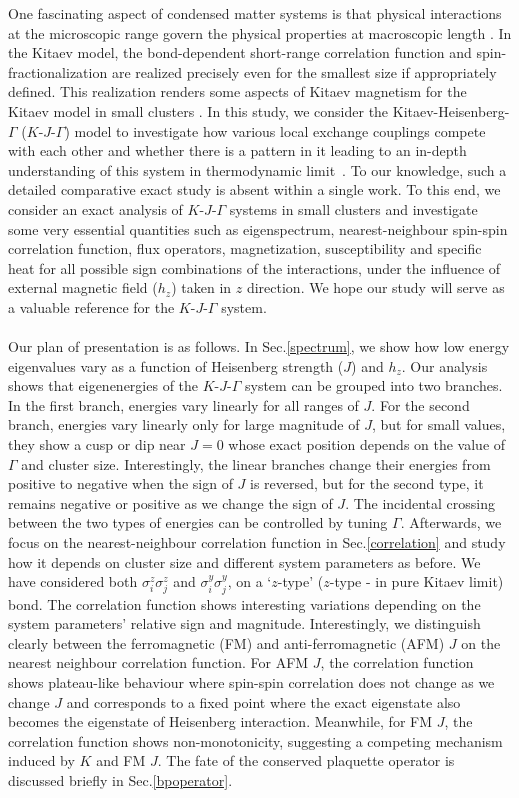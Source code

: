 \documentclass[aps,amsmath,twocolumn,amssymb,floatfix,showpacs,superscriptaddress,nofootinbib,longbibliography]{revtex4-1}
\begin{document}
One fascinating aspect of condensed matter systems is that physical interactions at the microscopic range govern the physical properties at macroscopic length \cite{anderson,fifty-years,savary-review}. In the Kitaev model, the bond-dependent short-range correlation function and spin-fractionalization are realized precisely even for the smallest size if appropriately defined. This realization renders some aspects of Kitaev magnetism for the Kitaev model in small clusters \cite{tathagata-2020,kataoka-jpsj-2020}. In this study, we consider the Kitaev-Heisenberg-$\Gamma$ ($K$-$J$-$\Gamma$) model \cite{Rau-2014} to investigate how various local exchange couplings compete with each other and whether there is a pattern in it leading to an in-depth understanding of this system in thermodynamic limit~\cite{wang-2020}. To our knowledge, such a detailed comparative exact study is absent within a single work. To this end, we consider an exact analysis of $K$-$J$-$\Gamma$ systems in small clusters and investigate some very essential quantities such as eigenspectrum, nearest-neighbour spin-spin correlation function, flux operators, magnetization, susceptibility and specific heat for all possible sign combinations of the interactions, under the influence of external magnetic field ($h_z$) taken in $\hat{z}$ direction. We hope our study will serve as a valuable reference for the $K$-$J$-$\Gamma$ system.
\\\\\indent
Our plan of presentation is as follows. In Sec.\ref{spectrum}, we show how low energy eigenvalues vary as a function of Heisenberg strength ($J$) and $h_z$. Our analysis shows that eigenenergies of the $K$-$J$-$\Gamma$ system can be grouped into two branches. In the first branch, energies vary linearly for all ranges of $J$. For the second branch, energies vary linearly only for large magnitude of $J$, but for small values, they show a cusp or dip near $J=0$ whose exact position depends on the value of $\Gamma$ and cluster size. Interestingly, the linear branches change their energies from positive to negative when the sign of $J$ is reversed, but for the second type, it remains negative or positive as we change the sign of $J$. The incidental crossing between the two types of energies can be controlled by tuning $\Gamma$. Afterwards, we focus on the nearest-neighbour correlation function in Sec.\ref{correlation} and study how it depends on cluster size and different system parameters as before. We have considered both $\sigma^z_i \sigma^z_j$ and $\sigma^y_i \sigma^y_j$, on a `$z$-type' ($z$-type - in pure Kitaev limit) bond. The correlation function shows interesting variations depending on the system parameters' relative sign and magnitude. Interestingly, we distinguish clearly between the ferromagnetic (FM) and anti-ferromagnetic (AFM) $J$ on the nearest neighbour correlation function. For AFM $J$, the correlation function shows plateau-like behaviour where spin-spin correlation does not change as we change $J$ and corresponds to a fixed point where the exact eigenstate also becomes the eigenstate of Heisenberg interaction. Meanwhile, for FM $J$, the correlation function shows non-monotonicity, suggesting a competing mechanism induced by $K$ and FM $J$. The fate of the conserved plaquette operator is discussed briefly in Sec.\ref{bpoperator}.
\end{document}
